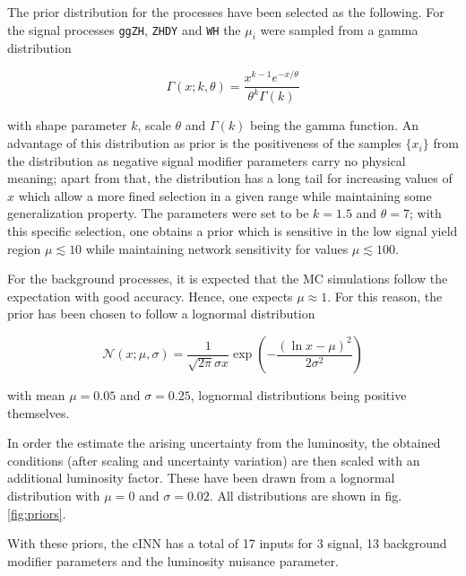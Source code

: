 The prior distribution for the processes have been selected as the following. For the signal processes \texttt{ggZH}, \texttt{ZHDY} and \texttt{WH} the $\mu_i$ were sampled from a gamma distribution

\begin{equation*}
	\Gamma(x; k, \theta) = \frac{x^{k-1}e^{-x/\theta}}{\theta^k\Gamma(k)}
\end{equation*}

with shape parameter $k$, scale $\theta$ and $\Gamma(k)$ being the gamma function. An advantage of this distribution as prior is the positiveness of the samples $\{x_i\}$ from the distribution as negative signal modifier parameters carry no physical meaning; apart from that, the distribution has a long tail for increasing values of $x$ which allow a more fined selection in a given range while maintaining some generalization property. The parameters were set to be $k = 1.5$ and $\theta = 7$; with this specific selection, one obtains a prior which is sensitive in the low signal yield region $\mu \lesssim 10$ while maintaining network sensitivity for values $\mu\lesssim100$.

For the background processes, it is expected that the MC simulations follow the expectation with good accuracy. Hence, one expects $\mu \approx 1$. For this reason, the prior has been chosen to follow a lognormal distribution

\begin{equation*}
	\mathcal{N}(x; \mu, \sigma) = \frac{1}{\sqrt{2\pi }\sigma x}\exp\left(-\frac{\left(\ln x-\mu\right)^2}{2\sigma^2}\right)
\end{equation*}

with mean $\mu = 0.05$ and $\sigma = 0.25$, lognormal distributions being positive themselves.

In order the estimate the arising uncertainty from the luminosity, the obtained conditions (after scaling and uncertainty variation) are then scaled with an additional luminosity factor. These have been drawn from a lognormal distribution with $\mu = 0$ and $\sigma = 0.02$. All distributions are shown in fig. \ref{fig:priors}.

With these priors, the cINN has a total of 17 inputs for 3 signal, 13 background modifier parameters and the luminosity nuisance parameter.

